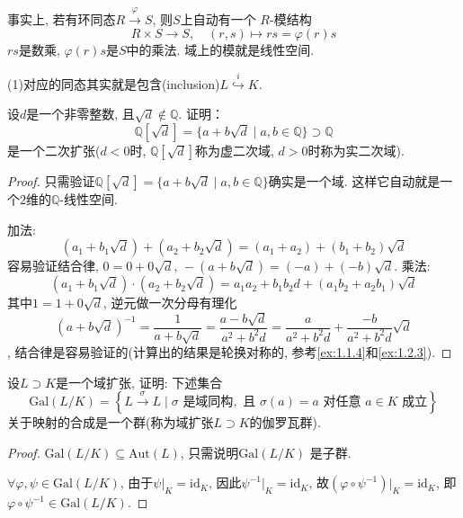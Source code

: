 \begin{remark}
    事实上, 若有环同态$R \overset{\varphi}\to S$, 则$S$上自动有一个
    $R$-模结构
    \[
        R \times S \to S, \quad (r, s) \mapsto rs = \varphi(r)s
    \]
    $rs$是数乘, $\varphi(r)s$是$S$中的乘法. 域上的模就是线性空间.
    
    (1)对应的同态其实就是包含(inclusion)$L \overset{i}\hookrightarrow K$.
\end{remark}

\begin{problem}
    设$d$是一个非零整数, 且$\sqrt d \notin \mathbb{Q}$. 证明：
\[
    \mathbb{Q}[\sqrt{d}] = \{a + b\sqrt{d} \mid a, b \in \mathbb{Q}\} \supset \mathbb{Q}
\]
是一个二次扩张($d < 0$时, $\mathbb{Q}[\sqrt{d}]$称为虚二次域, $d > 0$时称为实二次域).
\end{problem}

\begin{proof}
    只需验证$\mathbb{Q}[\sqrt{d}] = \{a + b\sqrt{d} \mid a, b \in \mathbb{Q}\}$确实是一个域. 这样它自动就是一个$2$维的$\mathbb{Q}$-线性空间.
    
    加法:
    \[
        (a_1 + b_1\sqrt{d}) + (a_2 + b_2\sqrt{d}) = (a_1 + a_2) + (b_1 + b_2)\sqrt{d}
    \]
    容易验证结合律, $0 = 0 + 0\sqrt{d},\, -(a + b\sqrt{d}) = (-a) + (-b)\sqrt{d}$.
    乘法:
    \[
        (a_1 + b_1\sqrt{d}) \cdot (a_2 + b_2\sqrt{d}) = a_1a_2 + b_1b_2d + (a_1b_2 + a_2b_1)\sqrt{d}
    \]
    其中$1 = 1 + 0\sqrt{d}$, 逆元做一次分母有理化
    \[
        (a + b\sqrt{d})^{-1} = \frac{1}{a + b\sqrt{d}} = \frac{a - b\sqrt{d}}{a^2 + b^2d} = \frac{a}{a^2 + b^2d} + \frac{- b}{a^2 + b^2d}\sqrt{d}
    \],
    结合律是容易验证的(计算出的结果是轮换对称的, 参考\ref{ex:1.1.4}和\ref{ex:1.2.3}).
\end{proof}

\begin{problem}
    设$L \supset K$是一个域扩张, 证明: 下述集合
\[
\mathrm{Gal}(L/K)=
\left\{L \xrightarrow{\sigma} L \mid \sigma\text{ 是域同构},\text{ 且 } \sigma(a) = a \text{ 对任意 } a \in K \text{ 成立}\right\}
\]
关于映射的合成是一个群(称为域扩张$L\supset K$的伽罗瓦群).
\end{problem}

\begin{proof}
    $\mathrm{Gal}(L/K) \subseteq \mathrm{Aut}(L)$, 只需说明$\mathrm{Gal}(L/K)$
是子群.

    $\forall \varphi, \psi \in \mathrm{Gal}(L/K)$, 由于$\psi|_K = \mathrm{id}_K$,
因此$\psi^{-1}|_K = \mathrm{id}_K$, 故$(\varphi \circ \psi^{-1})|_K = \mathrm{id}_K$,
即$\varphi \circ \psi^{-1} \in \mathrm{Gal}(L/K)$.
\end{proof}

